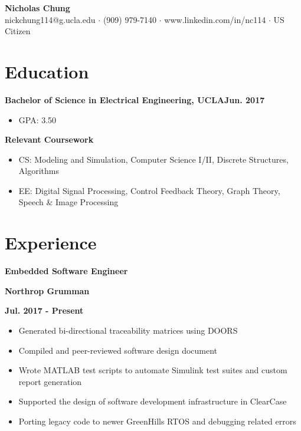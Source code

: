 \documentclass[12pt]{article}
\newcommand\textbox[1]{\parbox{.333\textwidth}{#1}}
\newcommand{\textlcr}[3]{\textbox{\textbf{#1}\hfill}\textbox{\hfil \textbf{#2}\hfil}\textbox{\hfill \textbf{#3}}}
\begin{document}
\begin{center}
	\textbf{\LARGE Nicholas Chung} \\ \vspace{.5ex}
	nickchung114@g.ucla.edu $\cdot$ (909) 979-7140 $\cdot$ www.linkedin.com/in/nc114 $\cdot$ US Citizen
\end{center}

\vspace{-8pt}
\smallskip
\section*{Education}
\vspace*{-1em}\makebox[\linewidth]{\rule{\textwidth}{0.4pt}}

\textbf{Bachelor of Science in Electrical Engineering, UCLA}\hfill\textbf{Jun. 2017}
\begin{itemize}
\item GPA: 3.50
\end{itemize}

\textbf{Relevant Coursework}
\begin{itemize}
\item CS: Modeling and Simulation, Computer Science I/II, Discrete Structures, Algorithms
\item EE: Digital Signal Processing, Control Feedback Theory, Graph Theory, Speech \& Image Processing
\end{itemize}

\section*{Experience}
\vspace*{-1em}\makebox[\linewidth]{\rule{\textwidth}{0.4pt}}

\textlcr{Embedded Software Engineer}{Northrop Grumman}{Jul. 2017 - Present}
\begin{itemize}
\item Generated bi-directional traceability matrices using DOORS
\item Compiled and peer-reviewed software design document
\item Wrote MATLAB test scripts to automate Simulink test suites and custom report generation
\item Supported the design of software development infrastructure in ClearCase
\item Porting legacy code to newer GreenHills RTOS and debugging related errors
\end{itemize}
\end{document}
